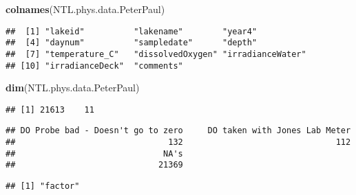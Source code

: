\documentclass[]{article}
\newenvironment{Shaded}{\begin{snugshade}}{\end{snugshade}}
\newcommand{\KeywordTok}[1]{\textcolor[rgb]{0.13,0.29,0.53}{\textbf{#1}}}
\newcommand{\CommentTok}[1]{\textcolor[rgb]{0.56,0.35,0.01}{\textit{#1}}}
\newcommand{\OperatorTok}[1]{\textcolor[rgb]{0.81,0.36,0.00}{\textbf{#1}}}
\newcommand{\NormalTok}[1]{#1}
\begin{document}
\begin{Shaded}
\begin{Highlighting}[]
\KeywordTok{colnames}\NormalTok{(NTL.phys.data.PeterPaul)}
\end{Highlighting}
\end{Shaded}

\begin{verbatim}
##  [1] "lakeid"          "lakename"        "year4"          
##  [4] "daynum"          "sampledate"      "depth"          
##  [7] "temperature_C"   "dissolvedOxygen" "irradianceWater"
## [10] "irradianceDeck"  "comments"
\end{verbatim}

\begin{Shaded}
\begin{Highlighting}[]
\KeywordTok{dim}\NormalTok{(NTL.phys.data.PeterPaul)}
\end{Highlighting}
\end{Shaded}

\begin{verbatim}
## [1] 21613    11
\end{verbatim}

\begin{Shaded}
\end{Shaded}

\begin{verbatim}
## DO Probe bad - Doesn't go to zero     DO taken with Jones Lab Meter 
##                               132                               112 
##                              NA's 
##                             21369
\end{verbatim}

\begin{Shaded}
\end{Shaded}

\begin{verbatim}
## [1] "factor"
\end{verbatim}
\end{document}
